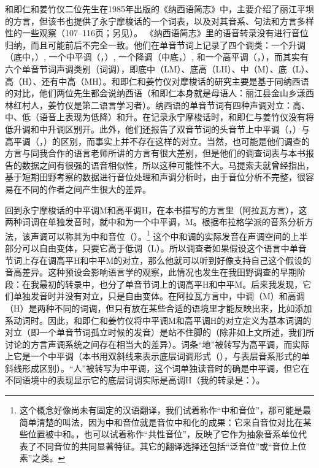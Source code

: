和即仁和姜竹仪二位先生在1985年出版的《纳西语简志》中，主要介绍了丽江平坝的{方言}，但该书也提供了永宁摩梭话的一个词表，以及对其音系、句法和{方言}多样性的一些观察（107–116页；另见\textcite{jiang1993}）。
《{纳西}语简志》里的语音转录没有进行音位归纳，而且可能前后不完全一致。他们在{单音节词}上记录了四个调类：一个升调（底中，）, 一个中{平调}（，）, 一个降调（中底，）, 和一个高{平调}（，），而其实有六个{单音节词}声调类别（词调），即底中（LM）、底高（LH）、中（M）、底（L）、高（H）、还有中高（MH）\parencite{michaud2017}。和即仁和姜竹仪对摩梭话的研究主要是基于同{纳西}语的对比，他们两位先生都会说{纳西}语（和即仁本身就是母语人：丽江县金山乡漾西林红村人，姜竹仪是第二语言学习者）。纳西语的{单音节词}有四种声调对立：高、中、低（语音上表现为低降）和升。在记录永宁摩梭话时，和即仁与姜竹仪没有将低升调和中升调区别开。此外，他们还报告了双音节词的头音节上中{平调}（，）与高{平调}（，）的区别，而事实上并不{存在}这样的对立。当然，也可能是他们调查的{方言}与同我合作的语言老师所讲的{方言}有很大差别，但是他们的调查词表与本书报告的数据之间有很强的语音相似性，所以这种可能性不大。马提索夫就曾经指出，基于短期田野考察的数据进行音位处理和声调分析时，由于音位分析不完整，很容易在不同的作者之间产生很大的差异\parencite[329]{matisoff2004}。

回到永宁摩梭话的中{平调}M和高{平调}H，在本书描写的{方言}里（阿拉瓦{方言}），这两种词调在{{单独}}发音时，就中和为一个中{平调}，M。根据{布拉格}学派的音系分析方法，该声调可以称其为{中和}音位（）。\footnote{{}这个概念好像尚未有固定的汉语翻译，我们试着称作“{中和}音位”，那可能是最简单清楚的叫法，因为中和音位就是音位中和化的成果：它来自音位对比在某些位置被中和。，也可以试着称作“共性音位”，反映了它作为抽象音系单位代表了不同音位的共同显著特征。其它的翻译选择还包括“泛音位”或“音位上位素”之类。}
这个中和调的实际发音在声调空间的上半部分可以{自由变体}，只要它高于低调（L）。所以调查者如果假设这个语言中{单音节词}上{存在}调高平H和中平M的对立，那么他就可以听到好像支持自己这个假设的音高差异。这种预设会影响语言学的观察，此情况也发生在我田野调查的早期阶段：在我最初的转录中，也分了{单音节词}上的调高平H和中平M。后来我发现，它们{单独}发音时并没有对立，只是自由变体。在阿拉瓦{方言}中，中调（M）和高调（H）是两种不同的词调，但只有放在某些合适的语境里才能反映出来，比如添加系动词时。因此，和即仁和姜竹仪将中{平调}M和高{平调}H的对立定义为基本词调的对立（即一个{单音节词}孤立时候的发音）是站不住脚的（除非如上文所述，我们所讨论的{方言}声调系统之间{存在}相当大的差异）。词条“地”被转写为高{平调}，而实际上它是一个中{平调}（本书用双斜线来表示底层词调形式（），与表层音系形式的单斜线形成区别）。“人”被转写为中{平调}，这个词{单独}读音时的确是中{平调}，但它在不同语境中的表现显示它的底层词调实际是高调H（我的转录是：）。

